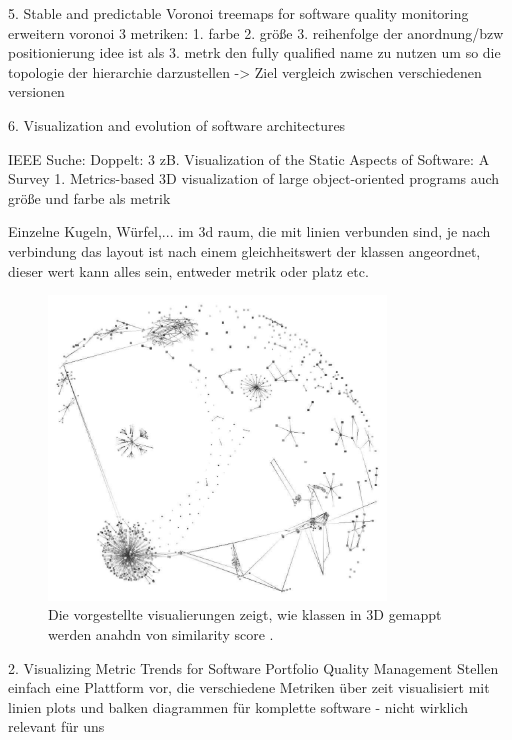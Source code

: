 5. Stable and predictable Voronoi treemaps for software quality monitoring \cite{stablePredictableVoronoi}
erweitern voronoi
3 metriken: 1. farbe 2. größe 3. reihenfolge der anordnung/bzw positionierung
idee ist als 3. metrk den fully qualified name zu nutzen um so die topologie der hierarchie darzustellen
-> Ziel vergleich zwischen verschiedenen versionen


6. Visualization and evolution of software architectures \cite{visualizationEvolution}

IEEE Suche:
Doppelt: 3 zB. Visualization of the Static Aspects of Software: A Survey \cite{staticSurvey}
1. Metrics-based 3D visualization of large object-oriented programs \cite{metricsBased3DVisualization}
auch größe und farbe als metrik

Einzelne Kugeln, Würfel,... im 3d raum, die mit linien verbunden sind, je nach verbindung
das layout ist nach einem gleichheitswert der klassen angeordnet, dieser wert kann alles sein, entweder metrik oder platz etc.

\begin{figure}
    \centering
    \includegraphics[width=0.8\textwidth]{images/literatur/metricsBased3DVisualization.png}
    \caption{Die vorgestellte visualierungen zeigt, wie klassen in 3D gemappt werden anahdn von similarity score  \cite[5]{metricsBased3DVisualization}.}
    \label{fig:metricsBased3DVisualization}
\end{figure}



2. Visualizing Metric Trends for Software Portfolio Quality Management \cite{visualizingMetricTrends}
Stellen einfach eine Plattform vor, die verschiedene Metriken über zeit visualisiert
mit linien plots und balken diagrammen für komplette software - nicht wirklich relevant für uns


